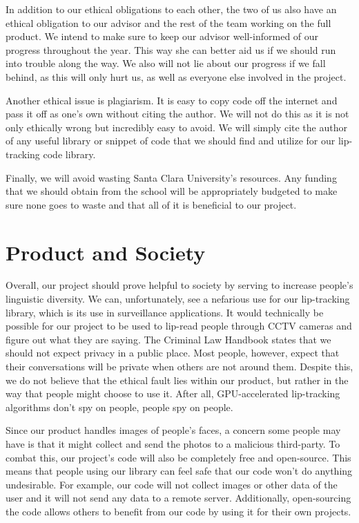 In addition to our ethical obligations to each other, the two of us also have an ethical obligation to our advisor and the rest of the team working on the full product. We intend to make sure to keep our advisor well-informed of our progress throughout the year. This way she can better aid us if we should run into trouble along the way. We also will not lie about our progress if we fall behind, as this will only hurt us, as well as everyone else involved in the project.

Another ethical issue is plagiarism. It is easy to copy code off the internet and pass it off as one's own without citing the author. We will not do this as it is not only ethically wrong but incredibly easy to avoid. We will simply cite the author of any useful library or snippet of code that we should find and utilize for our lip-tracking code library.

Finally, we will avoid wasting Santa Clara University's resources. Any funding that we should obtain from the school will be appropriately budgeted to make sure none goes to waste and that all of it is beneficial to our project.


\section{Product and Society}
Overall, our project should prove helpful to society by serving to increase people's linguistic diversity. We can, unfortunately, see a nefarious use for our lip-tracking library, which is its use in surveillance applications. It would technically be possible for our project to be used to lip-read people through CCTV cameras and figure out what they are saying. The Criminal Law Handbook states that we should not expect privacy in a public place. Most people, however, expect that their conversations will be private when others are not around them. Despite this, we do not believe that the ethical fault lies within our product, but rather in the way that people might choose to use it. After all, GPU-accelerated lip-tracking algorithms don't spy on people, people spy on people. 

Since our product handles images of people's faces, a concern some people may have is that it might collect and send the photos to a malicious third-party. To combat this, our project's code will also be completely free and open-source. This means that people using our library can feel safe that our code won't do anything undesirable. For example, our code will not collect images or other data of the user and it will not send any data to a remote server. Additionally, open-sourcing the code allows others to benefit from our code by using it for their own projects.
